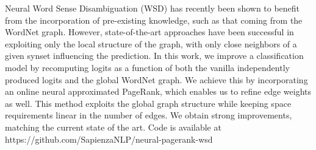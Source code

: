 Neural Word Sense Disambiguation (WSD) has recently been shown to benefit from the incorporation of pre-existing knowledge, such as that coming from the WordNet graph. However, state-of-the-art approaches have been successful in exploiting only the local structure of the graph, with only close neighbors of a given synset influencing the prediction. In this work, we improve a classification model by recomputing logits as a function of both the vanilla independently produced logits and the global WordNet graph. We achieve this by incorporating an online neural approximated PageRank, which enables us to refine edge weights as well. This method exploits the global graph structure while keeping space requirements linear in the number of edges. We obtain strong improvements, matching the current state of the art. Code is available at https://github.com/SapienzaNLP/neural-pagerank-wsd
